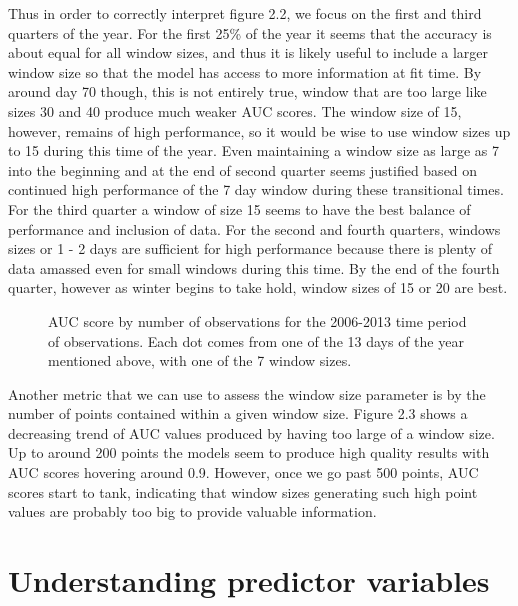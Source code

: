 \noindent Thus in order to correctly interpret figure 2.2, we focus on the first and third quarters of the year. For the first 25\% of the year it seems that the accuracy is about equal for all window sizes, and thus it is likely useful to include a larger window size so that the model has access to more information at fit time. By around day 70 though, this is not entirely true, window that are too large like sizes 30 and 40 produce much weaker AUC scores. The window size of 15, however, remains of high performance, so it would be wise to use window sizes up to 15 during this time of the year. Even maintaining a window size as large as 7 into the beginning and at the end of second quarter seems justified based on continued high performance of the 7 day window during these transitional times. For the third quarter a window of size 15 seems to have the best balance of performance and inclusion of data. For the second and fourth quarters, windows sizes or 1 - 2 days are sufficient for high performance because there is plenty of data amassed even for small windows during this time. By the end of the fourth quarter, however as winter begins to take hold, window sizes of 15 or 20 are best. \newline

\begin{figure} [!ht]
\centerline{}
\caption{AUC score by number of observations for the 2006-2013 time period of observations. Each dot comes from one of the 13 days of the year mentioned above, with one of the 7 window sizes. }
\label{fig6}
\end{figure}

\noindent Another metric that we can use to assess the window size parameter is by the number of points contained within a given window size. Figure 2.3 shows a decreasing trend of AUC values produced by having too large of a window size. Up to around 200 points the models seem to produce high quality results with AUC scores hovering around 0.9. However, once we go past 500 points, AUC scores start to tank, indicating that window sizes generating such high point values are probably too big to provide valuable information.  \newline



\section{Understanding predictor variables}

